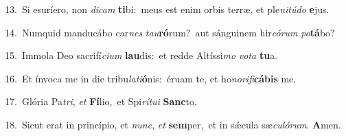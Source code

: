 {\numbfont\textcolor{\numbcolor}{13.}}~Si esuríero, non \textit{di}\-\textit{cam} \textbf{ti}\-bi:~\star meus est enim orbis terræ, et ple\-\textit{ni}\-\textit{tú}\textit{do} \textbf{e}\-jus.\par
{\numbfont\textcolor{\numbcolor}{14.}}~Numquid manducábo car\textit{nes} \textit{tau}\-\textbf{ró}rum?~\star aut sánguinem hir\-\textit{có}\-\textit{rum} \textit{po}\-\textbf{tá}bo?\par
{\numbfont\textcolor{\numbcolor}{15.}}~Immola Deo sacrifí\-\textit{ci}\-\textit{um} \textbf{lau}\-dis:~\star et redde Altíssi\textit{mo} \textit{vo}\-\textit{ta} \textbf{tu}\-a.\par
{\numbfont\textcolor{\numbcolor}{16.}}~Et ínvoca me in die tribu\-\textit{la}\-\textit{ti}\textbf{ó}nis:~\star éruam te, et ho\-\textit{no}\-\textit{ri}\textit{fi}\textbf{cá}\textbf{bis} me.\par
{\numbfont\textcolor{\numbcolor}{17.}}~Glória Pa\-\textit{tri}\-, \textit{et} \textbf{Fí}\-lio,~\star et Spi\-\textit{rí}\-\textit{tu}\textit{i} \textbf{Sanc}\-to.\par
{\numbfont\textcolor{\numbcolor}{18.}}~Sicut erat in princípio, et \textit{nunc}\-, \textit{et} \textbf{sem}\-per,~\star et in sǽcula sæ\-\textit{cu}\-\textit{ló}\textit{rum}. \textbf{A}\-men.\par
